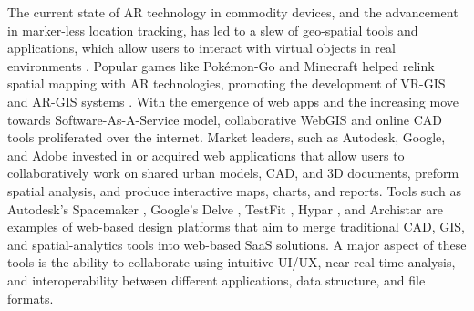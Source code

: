{{        \newline
        The current state of AR technology in commodity devices, and the advancement in marker-less location tracking, has led to a slew of geo-spatial tools and applications, which allow users to interact with virtual objects in real environments \cite{carozza2014markerless}. Popular games like Pokémon-Go and Minecraft helped relink spatial mapping with AR technologies, promoting the development of VR-GIS and AR-GIS systems \cite{boulos2017urban}.
        \newline
        With the emergence of web apps and the increasing move towards Software-As-A-Service model, collaborative WebGIS and online CAD tools proliferated over the internet. Market leaders, such as Autodesk, Google, and Adobe invested in or acquired web applications that allow users to collaboratively work on shared urban models, CAD, and 3D documents, preform spatial analysis, and produce interactive maps, charts, and reports.
        Tools such as Autodesk's Spacemaker \cite{Spacemak73:online}, Google's Delve \cite{DelvebyS33:online}, TestFit \cite{TestFitS86:online}, Hypar \cite{Hypar91:online}, and Archistar \cite{Property12:online} are examples of web-based design platforms that aim to merge traditional CAD, GIS, and spatial-analytics tools into web-based SaaS solutions. A major aspect of these tools is the ability to collaborate using intuitive UI/UX, near real-time analysis, and interoperability between different applications, data structure, and file formats.
    }

}
